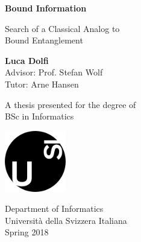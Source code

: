 \begin{titlepage}
    \begin{center}
        \vspace*{1cm}
        
        \Huge
        \textbf{Bound Information}
        
        \vspace{0.5cm}
        \LARGE
        {Search of a Classical Analog to\\ Bound Entanglement}
        
        \vspace{1.5cm}
        
        \textbf{Luca Dolfi}\\ 
         Advisor: Prof. Stefan Wolf \\ 
         Tutor: Arne Hansen \\
        
        \vfill
        
        A thesis presented for the degree of\\
        BSc in Informatics
        
        \vspace{0.8cm}
        
        \includegraphics[width=0.2\textwidth]{images/usi-immagini-logo-formatted.png}
        
        \Large
        Department of Informatics\\
        Universit\`a della Svizzera Italiana\\
        Spring 2018
        
    \end{center}
\end{titlepage}